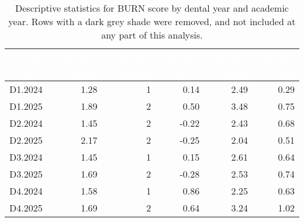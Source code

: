 \documentclass{article}
\begin{document}
\begin{table}[H]
\tiny
\centering
\tiny
\renewcommand{\arraystretch}{0.4}

\caption{Descriptive statistics for BURN score by dental year and academic year. Rows with a dark grey shade were removed, and not included at any part of this analysis.}
\label{tab:burnout_stats}

\begin{tabular}{|l|r|r|r|r|r|}
\hline
\rowcolor{black!80} 
\textcolor{white}{Dental Year} & \textcolor{white}{BURN Mean} & \textcolor{white}{BURN Median} & \textcolor{white}{BURN Skew} & \textcolor{white}{BURN Kurt} & \textcolor{white}{BURN Var} \\
\hline
D1.2024 & 1.28 & 1 & 0.14 & 2.49 & 0.29 \\
D1.2025 & 1.89 & 2 & 0.50 & 3.48 & 0.75 \\
\rowcolor{gray!50} D2.2024 & 1.45 & 2 & -0.22 & 2.43 & 0.68 \\
D2.2025 & 2.17 & 2 & -0.25 & 2.04 & 0.51 \\
D3.2024 & 1.45 & 1 & 0.15 & 2.61 & 0.64 \\
D3.2025 & 1.69 & 2 & -0.28 & 2.53 & 0.74 \\
\rowcolor{gray!50} D4.2024 & 1.58 & 1 & 0.86 & 2.25 & 0.63 \\
D4.2025 & 1.69 & 2 & 0.64 & 3.24 & 1.02 \\
\hline
\end{tabular}
\end{table}
\end{document}
